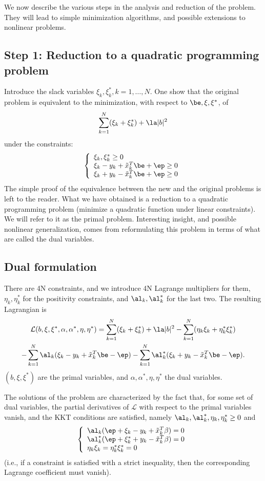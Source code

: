 We now  describe the various steps in the analysis and reduction of
the problem. They will lead to simple minimization algorithms, and
possible extensions to nonlinear problems.

\subsection{Step 1: Reduction to a quadratic programming problem} 
Introduce the slack
variables $\xi_k, \xi_k^*, k=1, \ldots, N$. One
show that the original problem
is equivalent to the minimization, with respect to $\be, \xi, \xi^*$, of
$$
\sum_{k=1}^N (\xi_k+ \xi_k^*) + \la |b|^2
$$
under the constraints:
$$
\left\{\begin{array}{l} \xi_k, \xi_k^* \geq 0\\ \xi_k - y_k + \tilde
x_k^T\be +\ep \geq 0\\
\xi_k + y_k - \tilde
x_k^T\be +\ep \geq 0
       \end{array}
\right.
$$
The simple proof of the equivalence between the new and the original problems
is left to the reader. What we have obtained is a reduction to a
quadratic programming problem (minimize a quadratic 
function under linear constraints). We will refer to it as the primal
problem. Interesting insight, and possible nonlinear generalization, comes from reformulating this problem in
terms of what are called the dual variables. 

\subsection{Dual formulation}
There are 4N constraints, and we introduce 4N Lagrange multipliers for
them, $\eta_k, \eta_k^*$ for the positivity constraints, and $\al_k,
\al_k^*$ for the last two. The resulting Lagrangian is
\begin{multline*}
\mathcal L (b , \xi, \xi^*, \alpha, \alpha^*, \eta, \eta^*) = \sum_{k=1}^N (\xi_k+ \xi_k^*) + \la |b|^2 - \sum_{k=1}^N
(\eta_k\xi_k + \eta_k^*\xi_k^*) \\
- \sum_{k=1}^N \al_k (\xi_k - y_k +
\tilde x_k^T\be - \ep)  - \sum_{k=1}^N \al_k^* (\xi_k + y_k -
\tilde x_k^T\be - \ep) .
\end{multline*}
$(b, \xi, \xi^*)$ are the primal variables, and $\alpha, \alpha^*,
\eta, \eta^*$ the dual variables.


The solutions of the problem are characterized by the fact that, for
some set of dual variables, the
partial derivatives of $\mathcal L$ with respect to the primal
variables vanish, and the KKT conditions are satisfied, namely
$\al_k, \al_k^*, \eta_k, \eta_k^* \geq
0$ and 
$$
\left\{\begin{array}{l}
\al_k (\ep + \xi_k - y_k + \tilde x_k^T\beta) = 0  \\
\al_k^* (\ep + \xi_k^* + y_k - \tilde x_k^T\beta) = 0  \\
\eta_k\xi_k = \eta_k^*\xi_k^* = 0
       \end{array}
\right.
$$
(i.e., if a
constraint is satisfied with a strict inequality, then the
corresponding Lagrange coefficient must vanish). 

